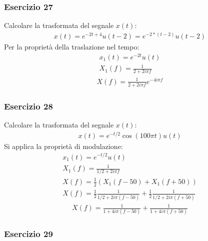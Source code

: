 \documentclass{article}
\begin{document}
\subsubsection*{Esercizio 27}

Calcolare la trasformata del segnale $x(t)$: 
\begin{gather*}
    x(t)=e^{-2t+4}u(t-2)=e^{-2*(t-2)}u(t-2)
\end{gather*}
Per la proprietà della traslazione nel tempo:
\begin{gather*}
    x_1(t)=e^{-2t}u(t)\\
    X_1(f)=\displaystyle\frac{1}{2+2i\pi f}
\end{gather*}
\begin{gather}
    X(f)=\displaystyle\frac{1}{2+2i\pi f}e^{-4i\pi f}
\end{gather}

\subsubsection*{Esercizio 28}

Calcolare la trasformata del segnale $x(t)$:
\begin{gather*}
    x(t)=e^{-t/2}\cos(100\pi t)u(t)
\end{gather*}
Si applica la proprietà di modulazione:
\begin{gather*}
    x_1(t)=e^{-t/2}u(t)\\
    X_1(f)=\displaystyle\frac{1}{1/2+2i\pi f}\\
    X(f)=\displaystyle\frac{1}{2}\left(X_1(f-50)+X_1(f+50)\right)\\
    X(f)=\displaystyle\frac{1}{2}\frac{1}{1/2+2i\pi (f-50)}+\frac{1}{2}\frac{1}{1/2+2i\pi (f+50)}
\end{gather*}
\begin{gather}
    X(f)=\displaystyle\frac{1}{1+4i\pi (f-50)}+\frac{1}{1+4i\pi (f+50)}
\end{gather}

\subsubsection*{Esercizio 29}
\end{document}
